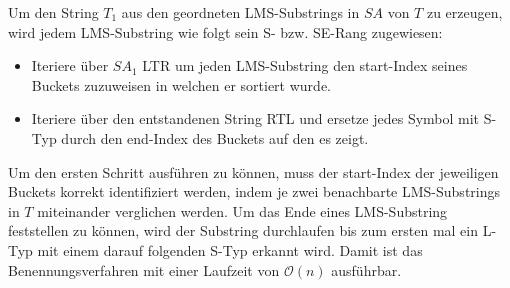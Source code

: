 Um den String $T_1$ aus den geordneten LMS-Substrings in $SA$ von $T$ zu erzeugen, wird jedem LMS-Substring wie folgt sein S- bzw. SE-Rang zugewiesen:

\begin{itemize}
\item Iteriere über $SA_1$ LTR um jeden LMS-Substring den start-Index seines Buckets zuzuweisen in welchen er sortiert wurde.
\item Iteriere über den entstandenen String RTL und ersetze jedes Symbol mit S-Typ durch den end-Index des Buckets auf den es zeigt.
\end{itemize}

Um den ersten Schritt ausführen zu können, muss der start-Index der jeweiligen Buckets korrekt identifiziert werden, indem je zwei benachbarte LMS-Substrings in $T$ miteinander verglichen werden. Um das Ende eines LMS-Substring feststellen zu können, wird der Substring durchlaufen bis zum ersten mal ein L-Typ mit einem darauf folgenden S-Typ erkannt wird. Damit ist das Benennungsverfahren mit einer Laufzeit von $\mathcal O(n)$ ausführbar.
